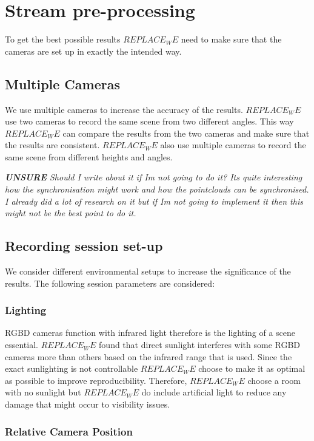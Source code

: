 \section{Stream pre-processing}
\label{sec:stream_pre_processing}

To get the best possible results $REPLACE_WE$ need to make sure that the cameras are set up in exactly the intended way. 

\subsection{Multiple Cameras}

We use multiple cameras to increase the accuracy of the results. $REPLACE_WE$ use two cameras to record the same scene from two different angles. This way $REPLACE_WE$ can compare the results from the two cameras and make sure that the results are consistent. $REPLACE_WE$ also use multiple cameras to record the same scene from different heights and angles.

\textit{\textbf{UNSURE} Should I write about it if Im not going to do it? Its quite interesting how the synchronisation might work and how the pointclouds can be synchronised. I already did a lot of research on it but if Im not going to implement it then this might not be the best point to do it.}

\subsection{Recording session set-up}

We consider different environmental setups to increase the significance of the results. The following session parameters are considered:

\subsubsection{Lighting}

RGBD cameras function with infrared light therefore is the lighting of a scene essential. $REPLACE_WE$ found that direct sunlight interferes with some RGBD cameras more than others based on the infrared range that is used. Since the exact sunlighting is not controllable $REPLACE_WE$ choose to make it as optimal as possible to improve reproducibility. Therefore, $REPLACE_WE$ choose a room with no sunlight but $REPLACE_WE$ do include artificial light to reduce any damage that might occur to visibility issues.

\subsubsection{Relative Camera Position}

